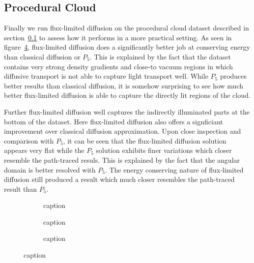 \subsection{Procedural Cloud}
\label{sec:pn_results_clouds}

Finally we run flux-limited diffusion on the procedural cloud dataset described in section~\ref{sec:pn_results_clouds} to assess how it performs in a more practical setting. As seen in figure~\ref{fig:fld_results_nebulae}, flux-limited diffusion does a significantly better job at conserving energy than classical diffusion or $P_5$. This is explained by the fact that the dataset contains very strong density gradients and close-to vacuum regions in which diffusive transport is not able to capture light transport well. While $P_5$ produces better results than classical diffusion, it is somehow surprising to see how much better flux-limited diffusion is able to capture the directly lit regions of the cloud.

Further flux-limited diffusion well captures the indirectly illuminated parts at the bottom of the dataset. Here flux-limited diffusion also offers a signficiant improvement over classical diffusion approximation. Upon close inspection and comparison with $P_5$, it can be seen that the flux-limited diffusion solution appears very flat while the $P_5$ solution exhibits finer variations which closer resemble the path-traced resuls. This is explained by the fact that the angular domain is better resolved with $P_5$. The energy conserving nature of flux-limited diffusion still produced a result which much closer resembles the path-traced result than $P_5$.

\begin{figure}[h]
\centering
\begin{subfigure}{0.31\columnwidth}
\caption{caption}
\label{fig:fld_results_nebulae_1}
\end{subfigure}
\hspace{0.01\columnwidth}
\begin{subfigure}{0.31\columnwidth}
\caption{caption}
\label{fig:fld_results_nebulae_2}
\end{subfigure}
\hspace{0.01\columnwidth}
\begin{subfigure}{0.31\columnwidth}
\caption{caption}
\label{fig:fld_results_nebulae_2}
\end{subfigure}%
\caption{caption}
\label{fig:fld_results_nebulae}
\end{figure}


